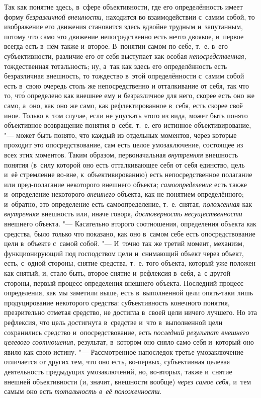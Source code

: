 Так как понятие здесь, в~сфере объективности, где его определённость
имеет форму {\em безразличной внешности,}
находится во взаимодействии с~самим собой, то изображение его
движения становится здесь вдвойне трудным и~запутанным, потому что само это
движение непосредственно есть нечто двоякое, и~первое всегда есть в~нём
также и~второе. В~понятии самом по себе, т.~е. в~его субъективности,
различие его от себя выступает как особая {\em непосредственная,}
тождественная тотальность; ну, а~так как здесь его
определённость есть безразличная внешность, то тождество в~этой
определённости с~самим собой есть в~свою очередь столь же непосредственно и
отталкивание от себя, так что то, чт\'{о} определено как внешнее ему и
безразличное для него, скорее есть оно же само, а~оно, как оно же само, как
рефлектированное в~себя, есть скорее своё иное. Только в~том случае, если
не упускать этого из вида, может быть понято объективное возвращение
понятия в~себя, т.~е. его истинное объективирование, "--- может
быть понято, что каждый из отдельных моментов, через которые проходит это
опосредствование, сам есть целое умозаключение, состоящее из всех этих
моментов. Таким образом, первоначальная
{\em внутренняя}
внешность понятия (в~силу которой оно есть отталкивающее себя
от себя единство, цель и~её стремление во-вне, к~объективированию) есть
непосредственное полагание или пред-полагание некоторого внешнего объекта;
{\em самоопределение}
есть также и~определение некоторого
{\em внешнего} объекта,
как не понятием определённого; и~обратно, это определение есть
самоопределение, т.~е. снятая,
{\em положенная} как
{\em внутренняя}
внешность или, иначе говоря,
{\em достоверность несущественности}
внешнего объекта. "--- Касательно второго
соотношения, определения объекта как средства, было только что показано,
как оно в~самом себе есть опосредствование цели в~объекте с~самой собой. "---
И~точно так же третий момент, механизм, функционирующий под
господством цели и~снимающий объект через объект, есть, с~одной стороны,
снятие средства, т.~е. того объекта, который уже положен как снятый, и,
стало быть, второе снятие и~рефлексия в~себя, а~с другой стороны, первый
процесс определения внешнего объекта. Последний процесс определения, как мы
заметили выше, есть в~выполненной цели опять-таки лишь
продуцирование некоторого средства: субъективность конечного понятия,
презрительно отметая средство, не достигла в~своей цели ничего лучшего. Но
эта рефлексия, что цель достигнута в~средстве и~что в~выполненной цели
сохранились средство и~опосредствование, есть
{\em последний результат внешнего
целевого соотношения,} результат, в~котором оно сняло само
себя и~который оно явило как свою истину. "--- Рассмотренное
напоследок третье умозаключение отличается от других тем, что оно есть,
во-первых, субъективная целевая деятельность предыдущих умозаключений, но,
во-вторых, также и~снятие внешней объективности (и, значит, внешности
вообще) {\em через самое себя,}
и~тем самым оно есть
{\em тотальность в~её положенности}.

